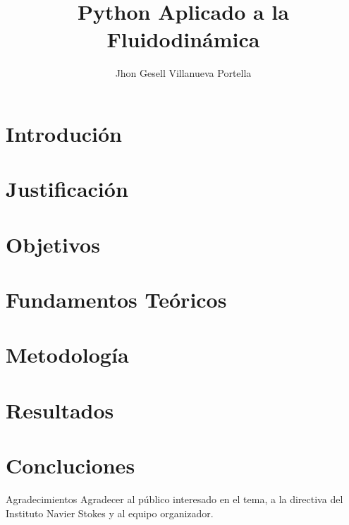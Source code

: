 \documentclass[11pt]{beamer}
\title[Introducción a la modelación numérica]{Python Aplicado a la Fluidodinámica}
\author[Jhon, V. P.]{
Jhon Gesell Villanueva Portella}
\begin{document}


\section{Introdución} 


\section{Justificación}


\section{Objetivos}


\section{Fundamentos Teóricos}


\section{Metodología}


\section{Resultados}


\section{Concluciones}


\begin{frame}{Agradecimientos}
    \large{Agradecer al público interesado en el tema, a la directiva del Instituto Navier Stokes y al equipo organizador.}
\end{frame}



%
%


\begin{frame}
\titlepage 
\end{frame}
\end{document}

